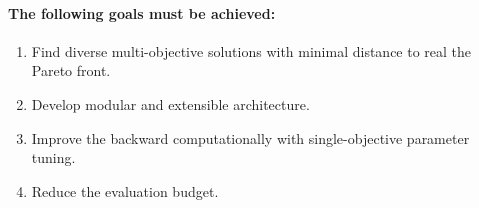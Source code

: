         \paragraph{The following goals must be achieved:}
        \begin{enumerate}
            \item Find diverse multi-objective solutions with minimal distance to real the Pareto front. 
            \item Develop modular and extensible architecture. 
            \item Improve the backward computationally with single-objective parameter tuning.
            \item Reduce the evaluation budget.
        \end{enumerate}